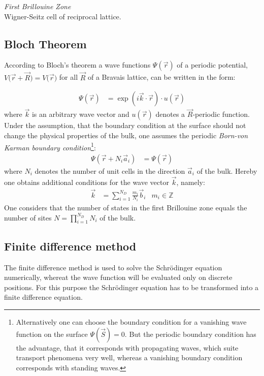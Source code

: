 \emph{First Brillouine Zone}\\
Wigner-Seitz cell of reciprocal lattice.\\

\subsection{Bloch Theorem}
According to Bloch's theorem a wave functions $\Psi(\vec{r})$ of a periodic potential, $V\big(\vec{r} + \vec{R}\big)= V\big(\vec{r}\big)$ for all $\vec{R}$ of a Bravais lattice, can be written in the form:

\begin{align}
	\Psi(\vec{r}) &= \exp\left(i\vec{k}\cdot\vec{r}\right) \cdot u\left(\vec{r}\right)
\end{align}
where $\vec{k}$ is an arbitrary wave vector and $u\left(\vec{r}\right)$ denotes a $\vec{R}$-periodic function.\\
Under the assumption, that the boundary condition at the surface should not change the physical properties of the bulk, one assumes the periodic \emph{Born-von Karman boundary condition}\footnote{Alternatively one can choose the boundary condition  for a vanishing wave function on the surface $\Psi\left(\vec{S}\right) = 0$. But the periodic boundary condition has the advantage, that it corresponds with propagating waves, which suite transport phenomena very well, whereas a vanishing boundary condition corresponds with standing waves.}:
\begin{align}
	\Psi\left(\vec{r} + N_i \vec{a}_i\right) &= \Psi\left(\vec{r}\right)
\end{align}
where $N_i$ denotes the number of unit cells in the direction $\vec{a}_i$ of the bulk. Hereby one obtains additional conditions for the wave vector $\vec{k}$, namely:
\begin{align}
	\vec{k} &= \sum_{i = 1}^{N_D} \frac{m_i}{N_i} \vec{b}_i & m_i \in \mathbb{Z} 
\end{align}
One considers that the number of states in the first Brillouine zone equals the number of sites $N = \prod_{i = 1}^{N_D}N_i$ of the bulk.\\

\subsection{Finite difference method}

The finite difference method is used to solve the Schrödinger equation numerically, whereat the wave function will be evaluated only on discrete positions. For this purpose the Schrödinger equation has to be transformed into a finite difference equation.\\

